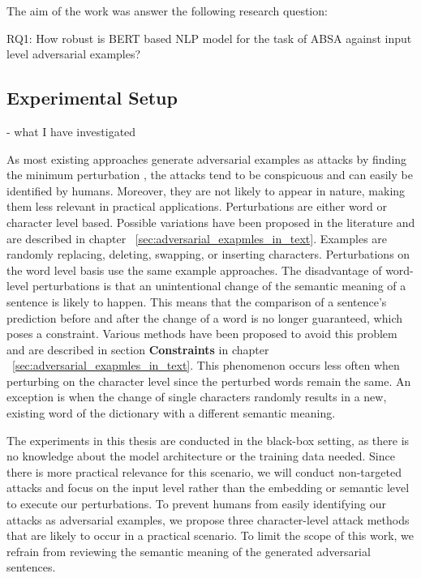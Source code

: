 The aim of the work was answer the following research question:

RQ1: How robust is BERT based NLP model for the task of ABSA against input level adversarial examples?


\subsection{Experimental Setup} 
- what I have investigated

As most existing approaches generate adversarial examples as attacks by finding the minimum perturbation \cite{liang2017deep, ebrahimi2017hotflip, gao2018black, li2018textbugger, alzantot2018generating, jin2019bert, garg2020bae}, the attacks tend to be conspicuous and can easily be identified by humans. Moreover, they are not likely to appear in nature, making them less relevant in practical applications. Perturbations are either word or character level based. Possible variations have been proposed in the literature and are described in chapter ~\ref{sec:adversarial_exapmles_in_text}. Examples are randomly replacing, deleting, swapping, or inserting characters. Perturbations on the word level basis use the same example approaches.  
The disadvantage of word-level perturbations is that an unintentional change of the semantic meaning of a sentence is likely to happen. This means that the comparison of a sentence's prediction before and after the change of a word is no longer guaranteed, which poses a constraint. Various methods have been proposed to avoid this problem and are described in section \textbf{Constraints} in chapter ~\ref{sec:adversarial_exapmles_in_text}. 
This phenomenon occurs less often when perturbing on the character level since the perturbed words remain the same. An exception is when the change of single characters randomly results in a new, existing word of the dictionary with a different semantic meaning. 

The experiments in this thesis are conducted in the black-box setting, as there is no knowledge about the model architecture or the training data needed. Since there is more practical relevance for this scenario, we will conduct non-targeted attacks and focus on the input level rather than the embedding or semantic level to execute our perturbations. 
To prevent humans from easily identifying our attacks as adversarial examples, we propose three character-level attack methods that are likely to occur in a practical scenario.
To limit the scope of this work, we refrain from reviewing the semantic meaning of the generated adversarial sentences.

